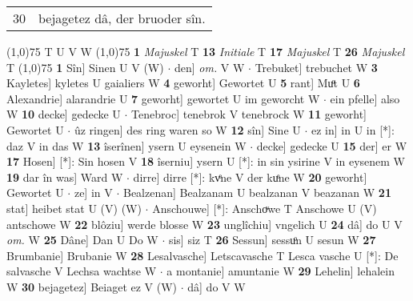 \documentclass[8pt,a4paper,notitlepage]{article}
\begin{document}
\begin{table}[ht]
\begin{minipage}[t]{0.5\linewidth}
\begin{tabular}{rl}
30 & bejagetez dâ, der bruoder sîn.\\ 
\end{tabular}
\scriptsize
\line(1,0){75} \newline
T U V W \newline
\line(1,0){75} \newline
\textbf{1} \textit{Majuskel} T  \textbf{13} \textit{Initiale} T  \textbf{17} \textit{Majuskel} T  \textbf{26} \textit{Majuskel} T  \newline
\line(1,0){75} \newline
\textbf{1} Sîn] Sinen U V (W)  $\cdot$ den] \textit{om.} V W  $\cdot$ Trebuket] trebuchet W \textbf{3} Kayletes] kyletes U gaialiers W \textbf{4} geworht] Gewortet U \textbf{5} rant] Muͦt U \textbf{6} Alexandrie] alarandrie U \textbf{7} geworht] gewortet U im geworcht W  $\cdot$ ein pfelle] also W \textbf{10} decke] gedecke U  $\cdot$ Tenebroc] tenebrok V tenebrock W \textbf{11} geworht] Gewortet U  $\cdot$ ûz ringen] des ring waren so W \textbf{12} sîn] Sine U  $\cdot$ ez in] in U in [*]: daz V in das W \textbf{13} îserînen] ysern U eysenein W  $\cdot$ decke] gedecke U \textbf{15} der] er W \textbf{17} Hosen] [*]: Sin hosen V \textbf{18} îserniu] ysern U [*]: in sin ysirine V in eysenem W \textbf{19} dar în was] Ward W  $\cdot$ dirre] dirre [*]: kvͤne V der kuͤne W \textbf{20} geworht] Gewortet U  $\cdot$ ze] in V  $\cdot$ Bealzenan] Bealzanam U bealzanan V beazanan W \textbf{21} stat] heibet stat U (V) (W)  $\cdot$ Anschouwe] [*]: Anschoͮwe T Anschowe U (V) antschowe W \textbf{22} blôziu] werde blosse W \textbf{23} unglîchiu] vngelich U \textbf{24} dâ] do U V \textit{om.} W \textbf{25} Dâne] Dan U Do W  $\cdot$ sis] siz T \textbf{26} Sessun] sessuͦn U sesun W \textbf{27} Brumbanie] Brubanie W \textbf{28} Lesalvasche] Letscavasche T Lesca vasche U [*]: De salvasche V Lechsa wachtse W  $\cdot$ a montanie] amuntanie W \textbf{29} Lehelin] lehalein W \textbf{30} bejagetez] Beiaget ez V (W)  $\cdot$ dâ] do V W \newline
\end{minipage}
\end{table}
\end{document}
